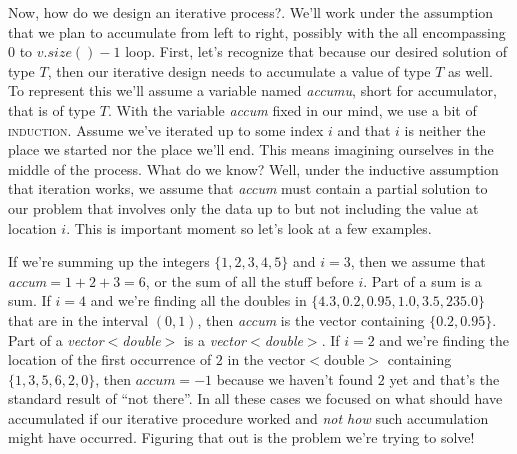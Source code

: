 \documentclass[]{tufte-handout}
\begin{document}
Now, how do we design an iterative process?. We'll work under the assumption that we plan to accumulate from left to right, possibly with the all encompassing $0$ to $v.size()-1$ loop. First, let's recognize that because our desired solution of type $T$, then our iterative design needs to accumulate a value of type $T$ as well. To represent this we'll assume a variable named \textit{accumu}, short for accumulator, that is of type $T$.  With the variable \textit{accum} fixed in our mind, we use a bit of \textsc{induction}. Assume we've iterated up to some index $i$ and that $i$ is neither the place we started nor the place we'll end.  This means imagining ourselves in the middle of the process.  What do we know? Well, under the inductive assumption that iteration works, we assume that \textit{accum} must contain a partial solution to our problem that involves only the data up to but not including the value at location $i$.  This is important moment so let's look at a few examples.

If we're summing up the integers $\{1,2,3,4,5\}$ and $i=3$, then we assume that \textit{accum}$=1+2+3=6$, or the sum of all the stuff before $i$.  Part of a sum is a sum. If $i=4$ and we're finding all the doubles in $\{ 4.3, 0.2, 0.95, 1.0, 3.5, 235.0 \}$ that are in the interval $(0,1)$, then \textit{accum} is the vector containing $\{0.2,0.95 \}$.  Part of a \textit{vector$<$double$>$} is a \textit{vector$<$double$>$}. If $i=2$ and we're finding the location of the first occurrence of $2$ in the vector$<$double$>$ containing $\{ 1,3,5,6,2,0 \}$, then $accum=-1$  because we haven't found $2$ yet and that's the standard result of ``not there''.  In all these cases we focused on what should have accumulated if our iterative procedure worked and \textit{not how}  such accumulation might have occurred. Figuring that out is the problem we're trying to solve!
\end{document}
